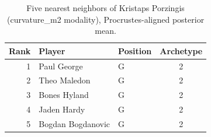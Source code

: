 \begin{table}[htbp]
  \centering\small
  \begin{tabular}{rllc}
    \toprule
    Rank & Player & Position & Archetype \\
    \midrule
    1 & Paul George & G & 2 \\
    2 & Theo Maledon & G & 2 \\
    3 & Bones Hyland & G & 2 \\
    4 & Jaden Hardy & G & 2 \\
    5 & Bogdan Bogdanovic & G & 2 \\
    \bottomrule
  \end{tabular}
  \caption{Five nearest neighbors of Kristaps Porzingis (curvature_m2 modality), Procrustes-aligned posterior mean.}
  \label{tab:Kristaps_Porzingis_neighbors_curvature_m2}
\end{table}

